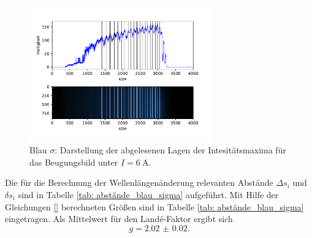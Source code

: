 \begin{figure}
  \centering
  \includegraphics[width = 0.7\textwidth]{../Messdaten/plots/peaks_blau_sigma_6.pdf}
  \caption{Blau $\sigma$: Darstellung der abgelesenen Lagen der Intesitätsmaxima für das Beugungsbild unter $I =\SI{6}{\ampere}$.}
  \label{fig: peaks_blau_sigma_6}
\end{figure}
Die für die Berechnung der Wellenlängenänderung relevanten Abstände $\Delta s_i$ und $\delta s_i$ sind in Tabelle \ref{tab: abstände_blau_sigma}
aufgeführt. Mit Hilfe der Gleichungen \eqref{} berechneten Größen sind in Tabelle
\ref{tab: abstände_blau_sigma} eingetragen. Als Mittelwert für den Landé-Faktor ergibt sich %
\begin{equation}
  g = \num{2.02(2)}.
\end{equation}

